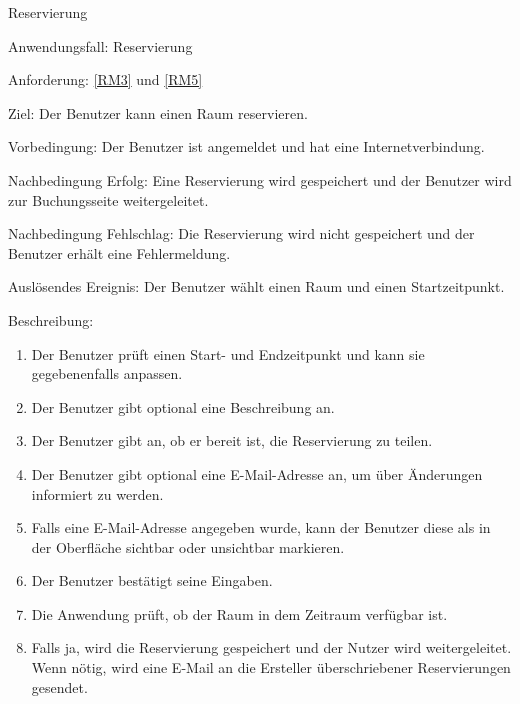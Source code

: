 \begin{function}{20}{Reservierung}
    \item[Anwendungsfall:] Reservierung
    \item[Anforderung:] \ref{RM3} und \ref{RM5}
    \item[Ziel:] Der Benutzer kann einen Raum reservieren.
    \item[Vorbedingung:] Der Benutzer ist angemeldet und hat eine Internetverbindung.
    \item[Nachbedingung Erfolg:] Eine Reservierung wird gespeichert und der Benutzer wird zur Buchungsseite weitergeleitet.
    \item[Nachbedingung Fehlschlag:] Die Reservierung wird nicht gespeichert und der Benutzer erhält eine Fehlermeldung.
    \item[Auslösendes Ereignis:] Der Benutzer wählt einen Raum und einen Startzeitpunkt.
    \item[Beschreibung:] ~
    \begin{enumerate}
        \item Der Benutzer prüft einen Start- und Endzeitpunkt und kann sie gegebenenfalls anpassen.
        \item Der Benutzer gibt optional eine Beschreibung an.
        \item Der Benutzer gibt an, ob er bereit ist, die Reservierung zu teilen.
        \item Der Benutzer gibt optional eine E-Mail-Adresse an, um über Änderungen informiert zu werden.
        \item Falls eine E-Mail-Adresse angegeben wurde, kann der Benutzer diese als in der Oberfläche sichtbar oder unsichtbar markieren.
        \item Der Benutzer bestätigt seine Eingaben.
        \item Die Anwendung prüft, ob der Raum in dem Zeitraum verfügbar ist.
        \item Falls ja, wird die Reservierung gespeichert und der Nutzer wird weitergeleitet.
              Wenn nötig, wird eine E-Mail an die Ersteller überschriebener Reservierungen gesendet.
    \end{enumerate}
\end{function}